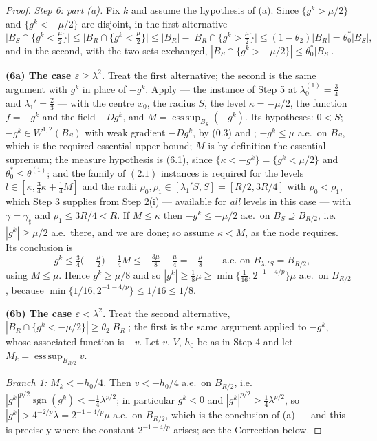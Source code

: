 \begin{proof}
\emph{Step 6: part \textup{(a)}.}  Fix $k$ and assume the hypothesis of (a).
Since $\{g^k>\mu/2\}$ and $\{g^k<-\mu/2\}$ are disjoint, in the first
alternative
\[
\bigl|B_S\cap\{g^k<\tfrac\mu2\}\bigr|
\le\bigl|B_R\cap\{g^k<\tfrac\mu2\}\bigr|
\le|B_R|-\bigl|B_R\cap\{g^k>\tfrac\mu2\}\bigr|
\le(1-\theta_2)|B_R|=\theta_0^\ast|B_S| ,
\tag{6.1}
\]
and in the second, with the two sets exchanged,
$|B_S\cap\{g^k>-\mu/2\}|\le\theta_0^\ast|B_S|$.

\textbf{(6a) The case $\varepsilon\ge\lambda^2$.}  Treat the first alternative;
the second is the same argument with $g^k$ in place of $-g^k$.  Apply
 --- the instance of Step 5 at
$\lambda_0^{(1)}=\tfrac34$ and $\lambda_1'=\tfrac23$ --- with the centre $x_0$,
the radius $S$, the level $\kappa=-\mu/2$, the function $f=-g^k$ and the field
$-Dg^k$, and $M=\operatorname{ess\,sup}_{B_S}(-g^k)$.  Its hypotheses: $0<S$;
$-g^k\in W^{1,2}(B_S)$ with weak gradient $-Dg^k$, by (0.3) and
; $-g^k\le\mu$ a.e.\ on $B_S$, which is the required
essential upper bound; $M$ is by definition the essential supremum; the measure
hypothesis is (6.1), since
$\{\kappa<-g^k\}=\{g^k<\mu/2\}$ and $\theta_0^\ast\le\theta^{(1)}$; and the
family of $(2.1)$ instances is required for the levels
$l\in[\kappa,\tfrac34\kappa+\tfrac14M]$ and the radii
$\rho_0,\rho_1\in[\lambda_1'S,S]=[R/2,3R/4]$ with $\rho_0<\rho_1$, which Step 3
supplies from Step 2(i) --- available for \emph{all} levels in this case --- with
$\gamma=\gamma_\sharp$ and $\rho_1\le 3R/4<R$.  If $M\le\kappa$ then
$-g^k\le-\mu/2$ a.e.\ on $B_S\supseteq B_{R/2}$, i.e.\ $|g^k|\ge\mu/2$ a.e.\
there, and we are done; so assume $\kappa<M$, as the node requires.  Its
conclusion is
\[
-g^k\le\tfrac34\bigl(-\tfrac\mu2\bigr)+\tfrac14M
\le-\tfrac{3\mu}8+\tfrac\mu4=-\tfrac\mu8
\qquad\text{a.e.\ on }B_{\lambda_1'S}=B_{R/2},
\]
using $M\le\mu$.  Hence $g^k\ge\mu/8$ and so
$|g^k|\ge\tfrac18\mu\ge\min\{\tfrac1{16},2^{-1-4/p}\}\mu$ a.e.\ on $B_{R/2}$,
because $\min\{1/16,2^{-1-4/p}\}\le1/16\le1/8$.

\textbf{(6b) The case $\varepsilon<\lambda^2$.}  Treat the second alternative,
$|B_R\cap\{g^k<-\mu/2\}|\ge\theta_2|B_R|$; the first is the same argument
applied to $-g^k$, whose associated function is $-v$.  Let $v$, $V$, $h_0$ be as
in Step 4 and let
$M_k=\operatorname{ess\,sup}_{B_{R/2}}v$.

\emph{Branch 1: $M_k<-h_0/4$.}  Then $v<-h_0/4$ a.e.\ on $B_{R/2}$, i.e.\
$|g^k|^{p/2}\operatorname{sgn}(g^k)<-\tfrac14\lambda^{p/2}$; in particular
$g^k<0$ and $|g^k|^{p/2}>\tfrac14\lambda^{p/2}$, so
$|g^k|>4^{-2/p}\lambda=2^{-1-4/p}\mu$ a.e.\ on $B_{R/2}$, which is the
conclusion of (a) --- and this is precisely where the constant
$2^{-1-4/p}$ arises; see the Correction below.


\end{proof}
